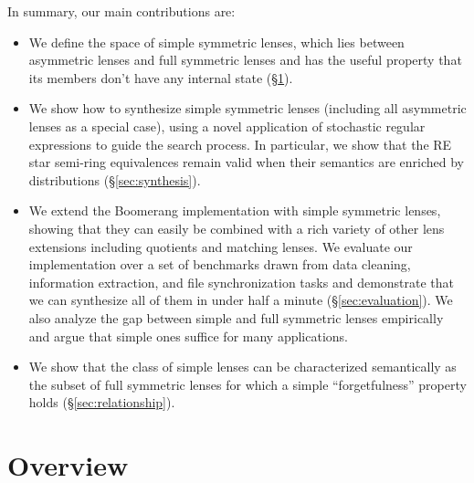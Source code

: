 \documentclass[acmsmall,screen,anonymous]{acmart}
\begin{document}
In summary, our main contributions are:
\begin{itemize}
\item We define the space of simple symmetric lenses, which lies between
  asymmetric lenses and full symmetric lenses and has the useful property that
  its members don't have any internal state (\S\ref{sec:overview}). 
\item We show how to synthesize simple symmetric lenses (including all asymmetric lenses as a special case),
using a novel application of stochastic regular expressions to guide the search process.  In particular, we
show that the RE star semi-ring equivalences remain valid when their semantics
are enriched by distributions (\S\ref{sec:synthesis}).
\item We extend the Boomerang implementation with simple symmetric lenses,
  showing that they can easily be combined with a rich variety of other lens
  extensions including quotients and matching lenses. We evaluate our
  implementation over a set of benchmarks drawn from data cleaning, information
  extraction, and file synchronization tasks and demonstrate that we can
  synthesize all of them in under half a minute (\S\ref{sec:evaluation}).
%
  We also analyze the gap between simple and full symmetric lenses
  empirically and argue that simple ones suffice for many applications.
\item We show that the class of simple lenses can be characterized semantically
  as the subset of full symmetric lenses for which a simple ``forgetfulness''
  property holds (\S\ref{sec:relationship}).
\end{itemize}


\noindent


\section{Overview}
\label{sec:overview}
\end{document}
